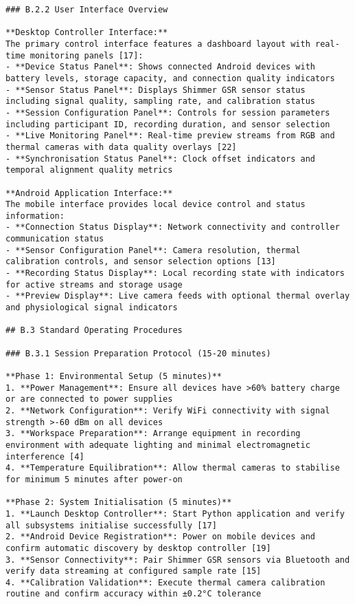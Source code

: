 \begin{verbatim}
### B.2.2 User Interface Overview

**Desktop Controller Interface:**
The primary control interface features a dashboard layout with real-time monitoring panels [17]:
- **Device Status Panel**: Shows connected Android devices with battery levels, storage capacity, and connection quality indicators
- **Sensor Status Panel**: Displays Shimmer GSR sensor status including signal quality, sampling rate, and calibration status
- **Session Configuration Panel**: Controls for session parameters including participant ID, recording duration, and sensor selection
- **Live Monitoring Panel**: Real-time preview streams from RGB and thermal cameras with data quality overlays [22]
- **Synchronisation Status Panel**: Clock offset indicators and temporal alignment quality metrics

**Android Application Interface:**
The mobile interface provides local device control and status information:
- **Connection Status Display**: Network connectivity and controller communication status
- **Sensor Configuration Panel**: Camera resolution, thermal calibration controls, and sensor selection options [13]
- **Recording Status Display**: Local recording state with indicators for active streams and storage usage
- **Preview Display**: Live camera feeds with optional thermal overlay and physiological signal indicators

## B.3 Standard Operating Procedures

### B.3.1 Session Preparation Protocol (15-20 minutes)

**Phase 1: Environmental Setup (5 minutes)**
1. **Power Management**: Ensure all devices have >60% battery charge or are connected to power supplies
2. **Network Configuration**: Verify WiFi connectivity with signal strength >-60 dBm on all devices
3. **Workspace Preparation**: Arrange equipment in recording environment with adequate lighting and minimal electromagnetic interference [4]
4. **Temperature Equilibration**: Allow thermal cameras to stabilise for minimum 5 minutes after power-on

**Phase 2: System Initialisation (5 minutes)**
1. **Launch Desktop Controller**: Start Python application and verify all subsystems initialise successfully [17]
2. **Android Device Registration**: Power on mobile devices and confirm automatic discovery by desktop controller [19]
3. **Sensor Connectivity**: Pair Shimmer GSR sensors via Bluetooth and verify data streaming at configured sample rate [15]
4. **Calibration Validation**: Execute thermal camera calibration routine and confirm accuracy within ±0.2°C tolerance


\end{verbatim}
